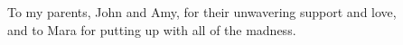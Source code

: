 \begin{dedication}
    To my parents, John and Amy, for their unwavering support and love, \\
    and to Mara for putting up with all of the madness.

\end{dedication}
